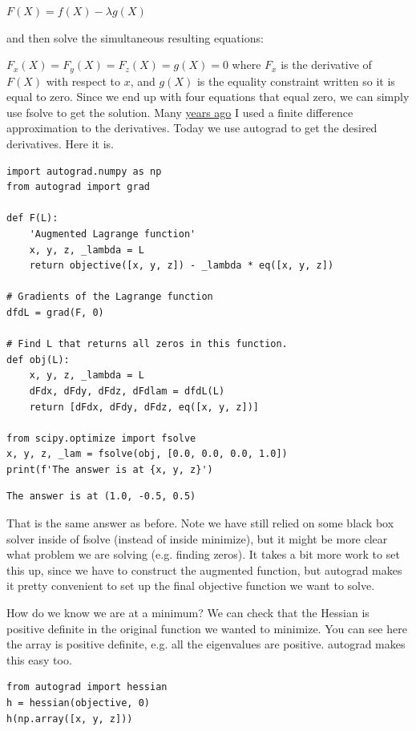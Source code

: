 \documentclass[11pt]{article}
\begin{document}
\(F(X) = f(X) - \lambda g(X)\)

and then solve the simultaneous resulting equations:

\(F_x(X) = F_y(X) = F_z(X) = g(X) = 0\) where \(F_x\) is the derivative of \(F(X)\) with respect to \(x\), and \(g(X)\) is the equality constraint written so it is equal to zero. Since we end up with four equations that equal zero, we can simply use fsolve to get the solution. Many \href{http://kitchingroup.cheme.cmu.edu/blog/2013/02/03/Using-Lagrange-multipliers-in-optimization/}{years ago} I used a finite difference approximation to the derivatives. Today we use autograd to get the desired derivatives. Here it is.

\begin{verbatim}
import autograd.numpy as np
from autograd import grad

def F(L):
    'Augmented Lagrange function'
    x, y, z, _lambda = L
    return objective([x, y, z]) - _lambda * eq([x, y, z])

# Gradients of the Lagrange function
dfdL = grad(F, 0)

# Find L that returns all zeros in this function.
def obj(L):
    x, y, z, _lambda = L
    dFdx, dFdy, dFdz, dFdlam = dfdL(L)
    return [dFdx, dFdy, dFdz, eq([x, y, z])]

from scipy.optimize import fsolve
x, y, z, _lam = fsolve(obj, [0.0, 0.0, 0.0, 1.0])
print(f'The answer is at {x, y, z}')
\end{verbatim}

\begin{verbatim}
The answer is at (1.0, -0.5, 0.5)

\end{verbatim}

That is the same answer as before. Note we have still relied on some black box solver inside of fsolve (instead of inside minimize), but it might be more clear what problem we are solving (e.g. finding zeros). It takes a bit more work to set this up, since we have to construct the augmented function, but autograd makes it pretty convenient to set up the final objective function we want to solve.

How do we know we are at a minimum? We can check that the Hessian is positive definite in the original function we wanted to minimize. You can see here the array is positive definite, e.g. all the eigenvalues are positive. autograd makes this easy too.

\begin{verbatim}
from autograd import hessian
h = hessian(objective, 0)
h(np.array([x, y, z]))
\end{verbatim}
\end{document}
